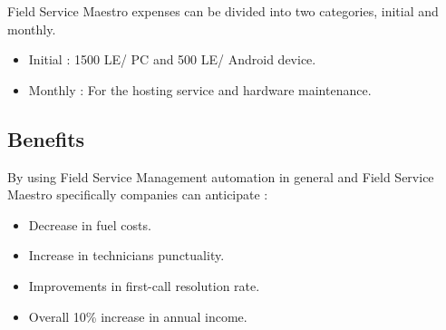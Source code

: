 Field Service Maestro expenses can be divided into two categories, initial and monthly.
\begin{itemize}
	\item Initial : 1500 LE/ PC and 500 LE/ Android device.
	\item Monthly : For the hosting service and hardware maintenance. 
\end{itemize}
\subsection{Benefits}
	By using Field Service Management automation in general and Field Service Maestro specifically companies can anticipate :
	\begin{itemize}
		\item Decrease in fuel costs.
		\item Increase in technicians punctuality. 
		\item Improvements in first-call resolution rate.\cite{benefits}
		\item Overall 10\% increase in annual income.\cite{roi}
	\end{itemize}